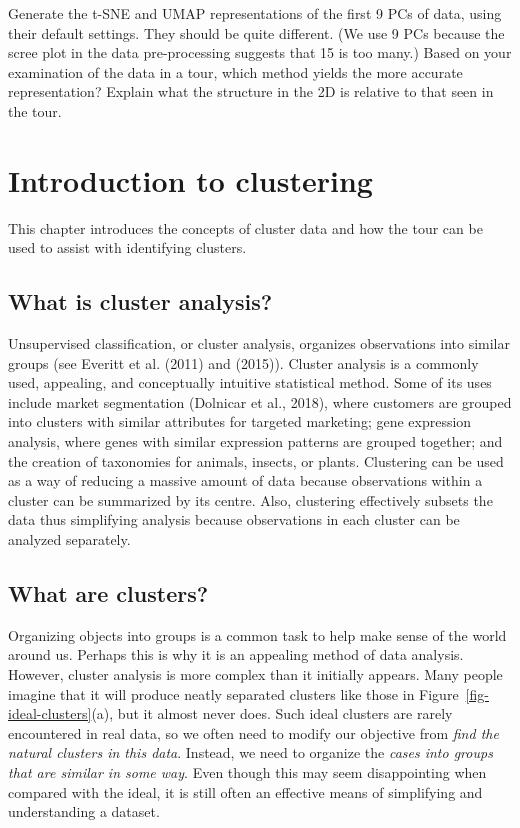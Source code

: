 \documentclass[
  letterpaper,
]{krantz}
\begin{document}
Generate the t-SNE and UMAP representations of the first 9 PCs of data,
using their default settings. They should be quite different. (We use 9
PCs because the scree plot in the data pre-processing suggests that 15
is too many.) Based on your examination of the data in a tour, which
method yields the more accurate representation? Explain what the
structure in the 2D is relative to that seen in the tour.


\chapter{Introduction to clustering}\label{introduction-to-clustering}

This chapter introduces the concepts of cluster data and how the tour
can be used to assist with identifying clusters.

\section{What is cluster analysis?}\label{what-is-cluster-analysis}

Unsupervised classification, or cluster analysis, organizes observations
into similar groups (see Everitt et al. (2011) and (2015)). Cluster
analysis is a commonly used, appealing, and conceptually intuitive
statistical method. Some of its uses include market segmentation
(Dolnicar et al., 2018), where customers are grouped into clusters with
similar attributes for targeted marketing; gene expression analysis,
where genes with similar expression patterns are grouped together; and
the creation of taxonomies for animals, insects, or plants. Clustering
can be used as a way of reducing a massive amount of data because
observations within a cluster can be summarized by its centre. Also,
clustering effectively subsets the data thus simplifying analysis
because observations in each cluster can be analyzed separately.

\section{What are clusters?}\label{what-are-clusters}

Organizing objects into groups is a common task to help make sense of
the world around us. Perhaps this is why it is an appealing method of
data analysis. However, cluster analysis is more complex than it
initially appears. Many people imagine that it will produce neatly
separated clusters like those in Figure~\ref{fig-ideal-clusters}(a), but
it almost never does. Such ideal clusters are rarely encountered in real
data, so we often need to modify our objective from \emph{find the
natural clusters in this data}. Instead, we need to organize the
\emph{cases into groups that are similar in some way}. Even though this
may seem disappointing when compared with the ideal, it is still often
an effective means of simplifying and understanding a dataset.
\end{document}
